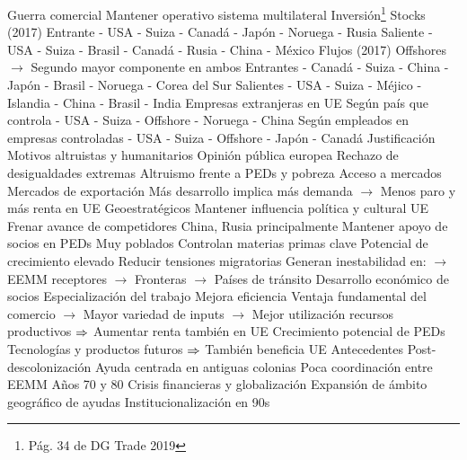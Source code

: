 \documentclass{nuevotema}
\begin{document}
\begin{esquemal}
				\4 Guerra comercial
				\4[] Mantener operativo sistema multilateral
		\2 Inversión\footnote{Pág. 34 de DG Trade 2019}
			\3 Stocks (2017)
				\4 Entrante
				 - USA
				 - Suiza
				 - Canadá
				 - Japón
				 - Noruega
				 - Rusia
				\4 Saliente
				 - USA
				 - Suiza
				 - Brasil
				 - Canadá
				 - Rusia
				 - China
				 - México
			\3 Flujos (2017)
				\4[] Offshores
				\4[] $\to$ Segundo mayor componente en ambos
				\4 Entrantes
				 - Canadá
				 - Suiza
				 - China
				 - Japón
				 - Brasil
				 - Noruega
				 - Corea del Sur
				\4 Salientes
				 - USA
				 - Suiza
				 - Méjico
				 - Islandia
				 - China
				 - Brasil
				 - India
			\3 Empresas extranjeras en UE
				\4 Según país que controla
				 - USA
				 - Suiza
				 - Offshore
				 - Noruega
				 - China
				\4 Según empleados en empresas controladas
				 - USA
				 - Suiza
				 - Offshore
				 - Japón
				 - Canadá
	\1 
		\2 Justificación
			\3 Motivos altruistas y humanitarios
				\4 Opinión pública europea
				\4[] Rechazo de desigualdades extremas
				\4[] Altruismo frente a PEDs y pobreza
			\3 Acceso a mercados
				\4 Mercados de exportación
				\4[] Más desarrollo implica más demanda
				\4[] $\to$ Menos paro y más renta en UE
			\3 Geoestratégicos
				\4 Mantener influencia política y cultural UE
				\4 Frenar avance de competidores
				\4[] China, Rusia principalmente
				\4 Mantener apoyo de socios en PEDs
				\4[] Muy poblados
				\4[] Controlan materias primas clave
				\4[] Potencial de crecimiento elevado
				\4 Reducir tensiones migratorias
				\4[] Generan inestabilidad en:
				\4[] $\to$ EEMM receptores
				\4[] $\to$ Fronteras
				\4[] $\to$ Países de tránsito
			\3 Desarrollo económico de socios
				\4 Especialización del trabajo
				\4[] Mejora eficiencia
				\4[] Ventaja fundamental del comercio
				\4[] $\to$ Mayor variedad de inputs
				\4[] $\to$ Mejor utilización recursos productivos
				\4[] $\Rightarrow$ Aumentar renta también en UE
				\4 Crecimiento potencial de PEDs
				\4[] Tecnologías y productos futuros
				\4[] $\Rightarrow$ También beneficia UE
		\2 Antecedentes
			\3 Post-descolonización
				\4 Ayuda centrada en antiguas colonias
				\4 Poca coordinación entre EEMM
			\3 Años 70 y 80
				\4 Crisis financieras y globalización
				\4 Expansión de ámbito geográfico de ayudas
			\3 Institucionalización en 90s

\end{esquemal}
\end{document}
